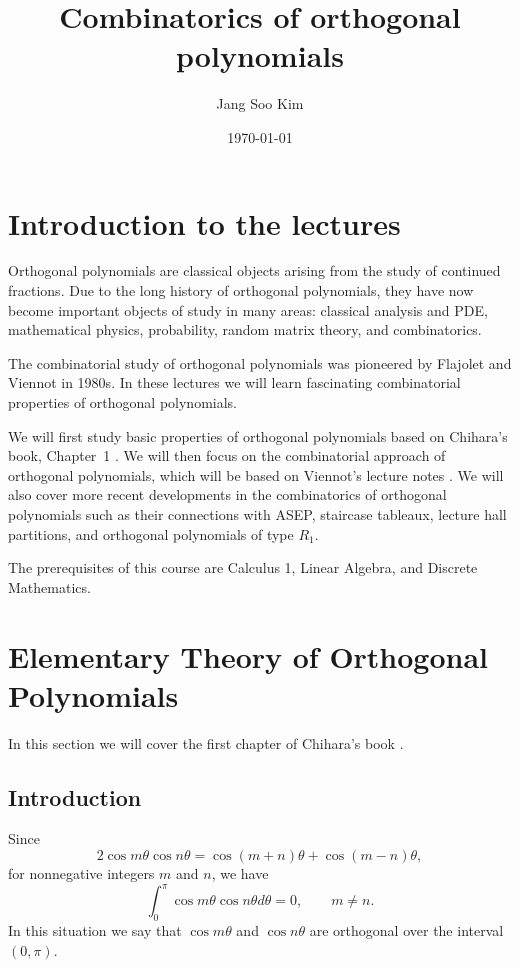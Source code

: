 \documentclass{amsart}
\title{Combinatorics of orthogonal polynomials}
\author{Jang Soo Kim}
\date{\today}
\numberwithin{equation}{section}
\theoremstyle{definition}
\begin{document}


\maketitle
\tableofcontents


\section{Introduction to the lectures}

Orthogonal polynomials are classical objects arising from the study of
continued fractions. Due to the long history of orthogonal
polynomials, they have now become important objects of study in many
areas: classical analysis and PDE, mathematical physics, probability,
random matrix theory, and combinatorics.

The combinatorial study of orthogonal polynomials was pioneered by
Flajolet and Viennot in 1980s. In these lectures we will learn
fascinating combinatorial properties of orthogonal polynomials.

We will first study basic properties of orthogonal polynomials based
on Chihara's book, Chapter~1 \cite{Chihara}. We will then focus on the
combinatorial approach of orthogonal polynomials, which will be based
on Viennot's lecture notes \cite{ViennotLN}. We will also cover more
recent developments in the combinatorics of orthogonal polynomials
such as their connections with ASEP, staircase tableaux, lecture hall
partitions, and orthogonal polynomials of type \( R_1 \).

The prerequisites of this course are Calculus 1, Linear Algebra, and
Discrete Mathematics.


\section{Elementary Theory of Orthogonal Polynomials}

In this section we will cover the first chapter of Chihara's book
\cite{Chihara}.

\subsection{Introduction}

Since
\[
  2\cos m\theta \cos n\theta  = \cos(m+n)\theta + \cos(m-n)\theta,
\]
for nonnegative integers \( m \) and \( n \), we have
\begin{equation}\label{eq:coscos=0}
  \int_0^\pi \cos m\theta \cos n\theta d\theta = 0, \qquad m\ne n.
\end{equation}
In this situation we say that \( \cos m\theta \) and
\( \cos n\theta \) are orthogonal over the interval \( (0,\pi) \).
\end{document}
